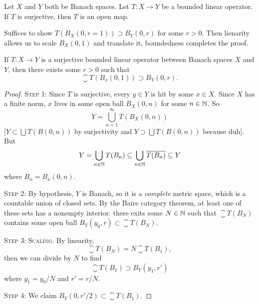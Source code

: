 \begin{theorem}
Let $X$ and $Y$ both be Banach spaces.
Let $T\colon X\to Y$ be a bounded linear operator.
If $T$ is surjective, then $T$ is an open map.
\end{theorem}

\begin{remark}
Suffices to show $T(B_{X}(0,r=1))\supset B_{Y}(0,r)$ for some
$r>0$. Then lienarity allows us to scale $B_{X}(0,1)$ and translate
it, boundedness completes the proof.
\end{remark}

\begin{lemma}If $T\colon X\to Y$ is a surjective bounded linear operator
between Banach spaces $X$ and $Y$, then there exists some $r>0$ such
that
\begin{equation}
\closure{T(B_{x}(0,1))}\supset B_{Y}(0,r).
\end{equation}
\end{lemma}

\begin{proof}
\textsc{Step 1:} Since $T$ is surjective, every $y\in Y$ is hit by
some $x\in X$. Since $X$ has a finite norm, $x$ lives in some open
ball $B_{X}(0,n)$ for some $n\in\mathbb{N}$. So
\begin{equation}
Y=\bigcup^{\infty}_{n=1}T(B_{X}(0,n))
\end{equation}
[$Y\subset\bigcup T(B(0,n))$ by surjectivity and $Y\supset\bigcup T(B(0,n))$
  because duh]. But
\begin{equation}
Y=\bigcup_{n\in\mathbb{N}}T(B_{n})\subseteq\bigcup_{n\in\mathbb{N}}\overline{T(B_{n})}\subseteq Y
\end{equation}
where $B_{n}=B_{x}(0,n)$.

\textsc{Step 2}: By hypothesis, $Y$ is Banach, so it is a
\emph{complete} metric space, which is a countable union of closed
sets. By  the Baire category theorem, at least one of these sets has a
nonempty interior: there exits some $N\in\mathbb{N}$ such that
$\closure{T}(B_{N})$ contains some open ball $B_{Y}(y_{0},r)\subset\closure{T}(B_{N})$.

\textsc{Step 3: Scaling}. By linearity,
\begin{equation}
\closure{T(B_{N})}=N\closure{T(B_{1})},
\end{equation}
then we can divide by $N$ to find
\begin{equation}
\closure{T(B_{1})}\supset B_{Y}(y_{1},r')
\end{equation}
where $y_{1}=y_{0}/N$ and $r'=r/N$.

\textsc{Step 4:} We claim $B_{Y}(0,r'/2)\subset\closure{T(B_{1})}$.
\end{proof}